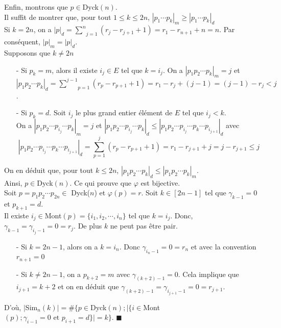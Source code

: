 Enfin, montrons que $p \in $\rm{Dyck}$(n)$.\\
Il suffit de montrer que, pour tout $1\leq k\leq 2n$, $| p_{1}\cdots p_{k} |_{m}\geq | p_{1}\cdots p_{k} |_{d}$\\
Si $k=2n$, on a $|p|_{d}=\underset{j=1}{\overset{n}{\sum}}(r_{j}-r_{j+1}+1)=r_{1}-r_{n+1}+n=n$. Par conséquent, $|p|_{m}=|p|_{d}$.\\
Supposons que $k\neq 2n$
\begin{itemize}
	\item [-] Si $p_{k}=m$, alors il existe $i_{j}\in E$ tel que $k=i_{j}$. On a $| p_{1}p_{2}\cdots p_{k} |_{m}=j$ et  \\ $| p_{1}p_{2}\cdots p_{k} |_{d}= \underset{p=1}{\overset{j-1}{\sum}}(r_{p}-r_{p+1}+1)=r_{1}-r_{j}+ (j-1)=(j-1)-r_{j}<j$.
	\item [-] Si $p_{k}=d$. Soit $i_{j}$ le plus grand entier élément de $E$ tel que $i_{j}<k$. \\
	      On a $| p_{1}p_{2}\cdots p_{i_{j}}\cdots p_{k} |_{m}=j$ et $| p_{1}p_{2}\cdots p_{i_{j}}\cdots p_{k} |_{d}\leq | p_{1}p_{2}\cdots p_{i_{j}}\cdots p_{k} \cdots p_{i_{j+1}}|_{d}$ avec
	      $$| p_{1}p_{2}\cdots p_{i_{j}}\cdots p_{k} \cdots p_{i_{j+1}}|_{d}= \underset{p=1}{\overset{j}{\sum}}(r_{p}-r_{p+1}+1)=r_{1}-r_{j+1}+j=j-r_{j+1}\leq j$$
\end{itemize}
On en déduit que, pour tout $k \leq 2n$, $| p_{1}p_{2}\cdots p_{k} |_{d} \leq | p_{1}p_{2}\cdots p_{k} |_{m}$.\\ Ainsi, $p\in $\rm{Dyck}$(n)$.
Ce qui prouve que $\varphi$ est bijective.\vspace{10pt}\\
Soit $p=p_{1}p_{2}\cdots p_{2n} \in $ Dyck($n$) et $\varphi(p)=r$.
Soit $k\in [2n-1]$ tel que $\gamma_{k-1}=0$ et $p_{k+1}=d$.\\ Il existe $i_{j}\in $\rm{Mont}$(p)=\{i_{1}, i_{2}, \cdots, i_{n}\}$ tel que $k=i_{j}$. Donc, $\gamma_{k-1}=\gamma_{i_{j}-1}=0=r_{j}$. De plus $k$ ne peut pas être pair.
\begin{itemize}
	\item [-] Si $k=2n-1$, alors on a $k=i_{n}$. Donc $\gamma_{i_{n}-1}=0=r_{n}$ et avec la convention $r_{n+1}=0$
	\item [-] Si $k\neq 2n-1$, on a $p_{k+2}=m$ avec $\gamma_{(k+2)-1}=0$. Cela implique que $i_{j+1} = k+2$ et on en déduit que $\gamma_{(k+2)-1}=\gamma_{i_{j+1}-1}=0=r_{j+1}$.
\end{itemize}
D'où, $|$\rm{Sim}$_{n}(k)| = \# \{p \in $\rm{Dyck}$(n); |\{i \in $\rm{Mont}$(p); \gamma_{i-1}=0 \text{ et } p_{i+1}=d\}|=k\}$. \hspace{10pt}$\blacksquare$

